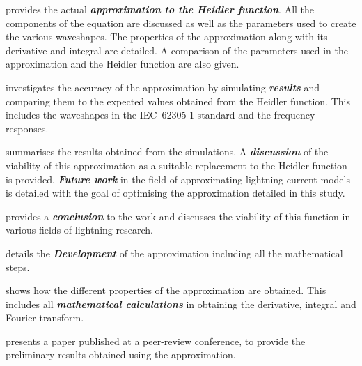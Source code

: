  provides the actual \textbf{\textit{approximation to the Heidler function}}. All the components of the equation are discussed as well as the parameters used to create the various waveshapes. The properties of the approximation along with its derivative and integral are detailed. A comparison of the parameters used in the approximation and the Heidler function are also given.

 investigates the accuracy of the approximation by simulating \textbf{\textit{results}} and comparing them to the expected values obtained from the Heidler function. This includes the waveshapes in the IEC~62305-1 standard and the frequency responses.

 summarises the results obtained from the simulations. A \textbf{\textit{discussion}} of the viability of this approximation as a suitable replacement to the Heidler function is provided. \textbf{\textit{Future work}} in the field of approximating lightning current models is detailed with the goal of optimising the approximation detailed in this study.

 provides a \textbf{\textit{conclusion}} to the work and discusses the viability of this function in various fields of lightning research.

 details the \textbf{\textit{Development}} of the approximation including all the mathematical steps.

 shows how the different properties of the approximation are obtained. This includes all \textbf{\textit{mathematical calculations}} in obtaining the derivative, integral and Fourier transform.

 presents a paper published at a peer-review conference, to provide the preliminary results obtained using the approximation.
